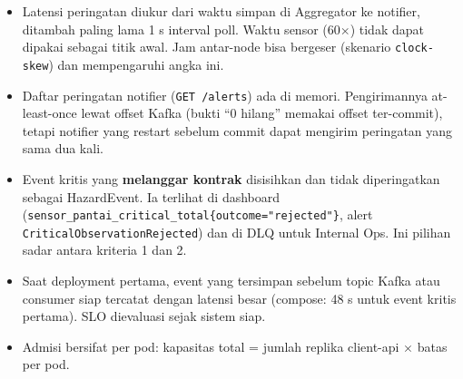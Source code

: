 \begin{itemize}
\item Latensi peringatan diukur dari waktu simpan di Aggregator ke notifier, ditambah paling lama 1 s interval poll. Waktu sensor (60$\times$) tidak dapat dipakai sebagai titik awal. Jam antar-node bisa bergeser (skenario \texttt{clock-\allowbreak{}skew}) dan mempengaruhi angka ini.
\item Daftar peringatan notifier (\texttt{GET /\allowbreak{}alerts}) ada di memori. Pengirimannya at-least-once lewat offset Kafka (bukti ``0 hilang'' memakai offset ter-commit), tetapi notifier yang restart sebelum commit dapat mengirim peringatan yang sama dua kali.
\item Event kritis yang \textbf{melanggar kontrak} disisihkan dan tidak diperingatkan sebagai HazardEvent. Ia terlihat di dashboard (\texttt{sensor\_\allowbreak{}pantai\_\allowbreak{}critical\_\allowbreak{}total\{outcome=\allowbreak{}"rejected"\}}, alert \texttt{Critical\allowbreak{}Observation\allowbreak{}Rejected}) dan di DLQ untuk Internal Ops. Ini pilihan sadar antara kriteria 1 dan 2.
\item Saat deployment pertama, event yang tersimpan sebelum topic Kafka atau consumer siap tercatat dengan latensi besar (compose: 48 s untuk event kritis pertama). SLO dievaluasi sejak sistem siap.
\item Admisi bersifat per pod: kapasitas total = jumlah replika client-api $\times$ batas per pod.
\end{itemize}
